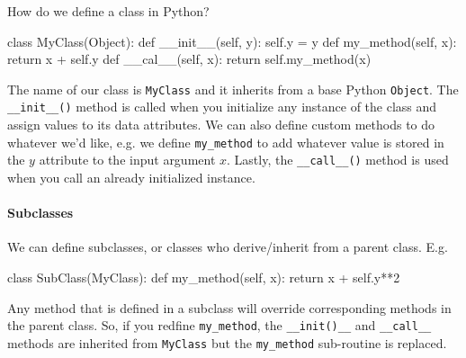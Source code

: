 \documentclass[12pt]{article}
\begin{document}
How do we define a class in Python?
\begin{python}
class MyClass(Object):
  def __init__(self, y):
    self.y = y
  def my_method(self, x):
    return x + self.y
  def __cal__(self, x):
    return self.my_method(x)  
\end{python}
The name of our class is \texttt{MyClass} and it inherits from a base Python \texttt{Object}. The \texttt{\_\_init\_\_()} method is called when you initialize any instance of the class and assign values to its data attributes. We can also define custom methods to do whatever we'd like, e.g. we define \texttt{my\_method} to add whatever value is stored in the $y$ attribute to the input argument $x$. Lastly, the \texttt{\_\_call\_\_()} method is used when you call an already initialized instance.

\paragraph{Subclasses} We can define subclasses, or classes who derive/inherit from a parent class. E.g.
\begin{python}
class SubClass(MyClass):
  def my_method(self, x):
    return x + self.y**2
\end{python}
Any method that is defined in a subclass will override corresponding methods in the parent class. So, if you redfine \texttt{my\_method}, the \texttt{\_\_init()\_\_} and \texttt{\_\_call\_\_} methods are inherited from \texttt{MyClass} but the \texttt{my\_method} sub-routine is replaced.
\end{document}

